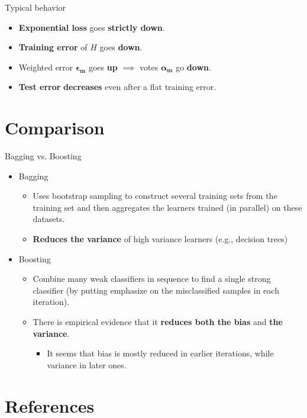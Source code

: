 \documentclass[serif, aspectratio=169]{beamer}
\begin{document}
\begin{frame}{Typical behavior}
    \begin{itemize}
        \itemsep1em
        \justifying
        \item \textbf{Exponential loss} goes \textbf{strictly down}.
        \item \textbf{Training error} of $H$ goes \textbf{down}.
        \item Weighted error $\boldsymbol{\epsilon_m}$ goes \textbf{up} $\implies$ votes $\boldsymbol{\alpha_m}$ go \textbf{down}.
        \item \textbf{Test error} \textbf{decreases} even after a flat training error.
    \end{itemize}
\end{frame}

\section{Comparison}

\begin{frame}{Bagging vs. Boosting}
    \begin{itemize}
        \itemsep1em
        \justifying
        \item Bagging
            \begin{itemize}
                \itemsep0.25em
                \justifying
                \item Uses bootstrap sampling to construct several training sets from the training set and then aggregates the learners trained (in parallel) on these datasets.
                \item \textbf{Reduces the variance} of high variance learners (e.g., decision trees)
            \end{itemize}
        \item Boosting
            \begin{itemize}
                \itemsep0.25em
                \justifying
                \item Combine many weak classifiers in sequence to find a single strong classifier (by putting emphasize on the misclassified samples in each iteration).
                \item There is empirical evidence that it \textbf{reduces both the bias} and \textbf{the variance}. 
                \begin{itemize}
                    \item It seems that bias is mostly reduced in earlier iterations, while variance in later ones.
                \end{itemize}
            \end{itemize}
    \end{itemize}
\end{frame}

\section{References}

\begin{frame}[allowframebreaks]
    
    
    \nocite{*}
\end{frame}
\end{document}
